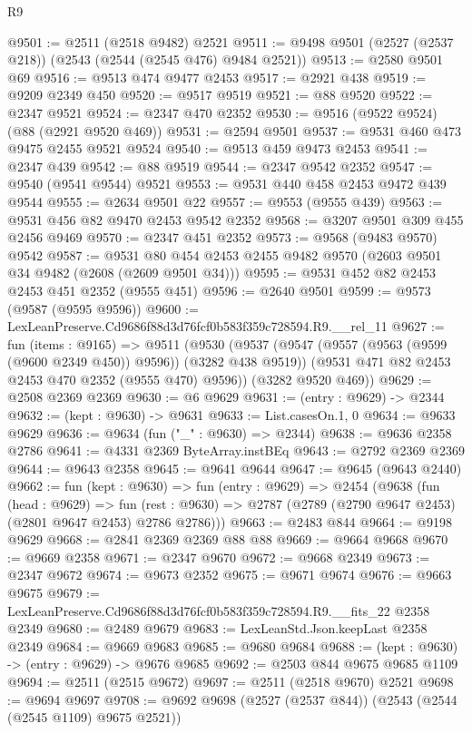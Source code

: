\begin{lexlean}{R9}
\begin{coremodule}
@9501 := @2511 (@2518 @9482) @2521
@9511 := @9498 @9501 (@2527 (@2537 @218)) (@2543 (@2544 (@2545 @476) @9484 @2521))
@9513 := @2580 @9501 @69
@9516 := @9513 @474 @9477 @2453
@9517 := @2921 @438
@9519 := @9209 @2349 @450
@9520 := @9517 @9519
@9521 := @88 @9520
@9522 := @2347 @9521
@9524 := @2347 @470 @2352
@9530 := @9516 (@9522 @9524) (@88 (@2921 @9520 @469))
@9531 := @2594 @9501
@9537 := @9531 @460 @473 @9475 @2455 @9521 @9524
@9540 := @9513 @459 @9473 @2453
@9541 := @2347 @439
@9542 := @88 @9519
@9544 := @2347 @9542 @2352
@9547 := @9540 (@9541 @9544) @9521
@9553 := @9531 @440 @458 @2453 @9472 @439 @9544
@9555 := @2634 @9501 @22
@9557 := @9553 (@9555 @439)
@9563 := @9531 @456 @82 @9470 @2453 @9542 @2352
@9568 := @3207 @9501 @309 @455 @2456 @9469
@9570 := @2347 @451 @2352
@9573 := @9568 (@9483 @9570) @9542
@9587 := @9531 @80 @454 @2453 @2455 @9482 @9570 (@2603 @9501 @34 @9482 (@2608 (@2609 @9501 @34)))
@9595 := @9531 @452 @82 @2453 @2453 @451 @2352 (@9555 @451)
@9596 := @2640 @9501
@9599 := @9573 (@9587 (@9595 @9596))
@9600 := LexLeanPreserve.Cd9686f88d3d76fcf0b583f359c728594.R9.__rel_11
@9627 := fun (items : @9165) =>
  @9511
    (@9530
      (@9537
        (@9547 (@9557 (@9563 (@9599 (@9600 @2349 @450)) @9596)) (@3282 @438 @9519))
        (@9531 @471 @82 @2453 @2453 @470 @2352 (@9555 @470) @9596))
      (@3282 @9520 @469))
@9629 := @2508 @2369 @2369
@9630 := @6 @9629
@9631 := (entry : @9629) -> @2344
@9632 := (kept : @9630) -> @9631
@9633 := List.casesOn.{1, 0}
@9634 := @9633 @9629
@9636 := @9634 (fun ("_" : @9630) => @2344)
@9638 := @9636 @2358 @2786
@9641 := @4331 @2369 ByteArray.instBEq
@9643 := @2792 @2369 @2369
@9644 := @9643 @2358
@9645 := @9641 @9644
@9647 := @9645 (@9643 @2440)
@9662 := fun (kept : @9630) =>
  fun (entry : @9629) =>
  @2454
    (@9638
      (fun (head : @9629) =>
      fun (rest : @9630) => @2787 (@2789 (@2790 @9647 @2453) (@2801 @9647 @2453) @2786 @2786)))
@9663 := @2483 @844
@9664 := @9198 @9629
@9668 := @2841 @2369 @2369 @88 @88
@9669 := @9664 @9668
@9670 := @9669 @2358
@9671 := @2347 @9670
@9672 := @9668 @2349
@9673 := @2347 @9672
@9674 := @9673 @2352
@9675 := @9671 @9674
@9676 := @9663 @9675
@9679 := LexLeanPreserve.Cd9686f88d3d76fcf0b583f359c728594.R9.__fits_22 @2358 @2349
@9680 := @2489 @9679
@9683 := LexLeanStd.Json.keepLast @2358 @2349
@9684 := @9669 @9683
@9685 := @9680 @9684
@9688 := (kept : @9630) -> (entry : @9629) -> @9676 @9685
@9692 := @2503 @844 @9675 @9685 @1109
@9694 := @2511 (@2515 @9672)
@9697 := @2511 (@2518 @9670) @2521
@9698 := @9694 @9697
@9708 := @9692 @9698 (@2527 (@2537 @844)) (@2543 (@2544 (@2545 @1109) @9675 @2521))

\end{coremodule}
\end{lexlean}
